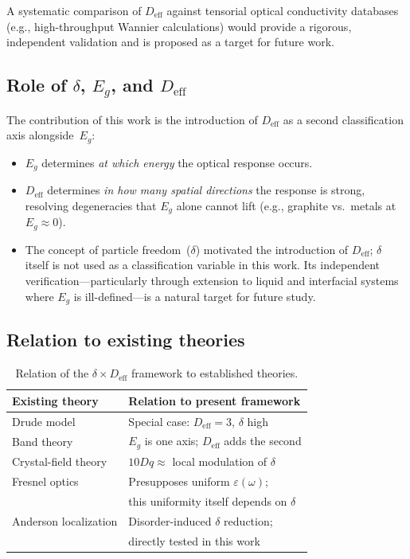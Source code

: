 \documentclass[twocolumn,showpacs,preprintnumbers,amsmath,amssymb,prb]{revtex4-2}
\begin{document}
A systematic comparison of $D_\mathrm{eff}$ against tensorial optical
conductivity databases (e.g., high-throughput Wannier calculations)
would provide a rigorous, independent validation and is proposed
as a target for future work.

\subsection{Role of $\delta$, $E_g$, and $D_\mathrm{eff}$}

The contribution of this work is the introduction of $D_\mathrm{eff}$
as a second classification axis alongside~$E_g$:
\begin{itemize}
  \item $E_g$ determines \emph{at which energy} the optical response
    occurs.
  \item $D_\mathrm{eff}$ determines \emph{in how many spatial
    directions} the response is strong, resolving degeneracies that
    $E_g$ alone cannot lift (e.g., graphite vs.\ metals at
    $E_g \approx 0$).
  \item The concept of particle freedom~($\delta$) motivated the
    introduction of $D_\mathrm{eff}$; $\delta$ itself is not used as
    a classification variable in this work. Its independent
    verification---particularly through extension to liquid and
    interfacial systems where $E_g$ is ill-defined---is a natural
    target for future study.
\end{itemize}

\subsection{Relation to existing theories}

\begin{table}[h]
\caption{Relation of the $\delta \times D_\mathrm{eff}$ framework to
  established theories.}
\label{tab:existing}
\begin{ruledtabular}
\begin{tabular}{ll}
  Existing theory & Relation to present framework \\
  \hline
  Drude model & Special case: $D_\mathrm{eff} = 3$, $\delta$ high \\
  Band theory & $E_g$ is one axis; $D_\mathrm{eff}$ adds the second \\
  Crystal-field theory & $10Dq \approx$ local modulation of $\delta$ \\
  Fresnel optics & Presupposes uniform $\varepsilon(\omega)$; \\
   & this uniformity itself depends on $\delta$ \\
  Anderson localization & Disorder-induced $\delta$ reduction; \\
   & directly tested in this work \\
\end{tabular}
\end{ruledtabular}
\end{table}
\end{document}
